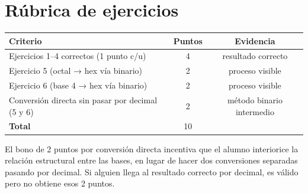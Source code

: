 \documentclass[12pt, oneside]{article}
\begin{document}
\section{Rúbrica de ejercicios}

\begin{center}
\begin{tabular}{lcc}
  \toprule
  \textbf{Criterio} & \textbf{Puntos} & \textbf{Evidencia} \\
  \midrule
  Ejercicios 1–4 correctos (1 punto c/u)          & 4 & resultado correcto \\
  Ejercicio 5 (octal → hex vía binario)            & 2 & proceso visible \\
  Ejercicio 6 (base 4 → hex vía binario)           & 2 & proceso visible \\
  Conversión directa sin pasar por decimal (5 y 6) & 2 & método binario intermedio \\
  \bottomrule
  \textbf{Total} & 10 & \\
\end{tabular}
\end{center}

\begin{notaprofesor}
  El bono de 2 puntos por conversión directa incentiva que el alumno
  interiorice la relación estructural entre las bases, en lugar de hacer
  dos conversiones separadas pasando por decimal.
  Si alguien llega al resultado correcto por decimal, es válido pero no
  obtiene esos 2 puntos.
\end{notaprofesor}
\end{document}
